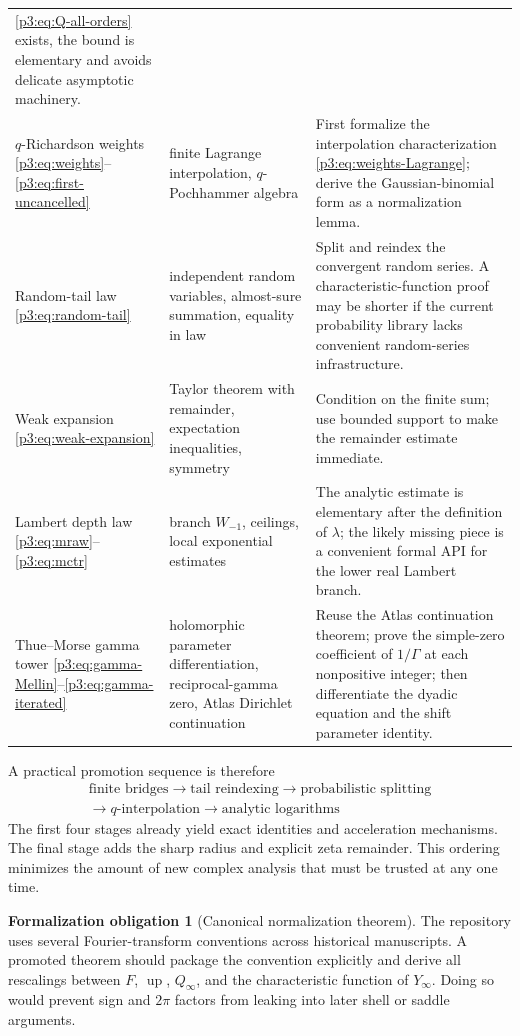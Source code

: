 \documentclass[11pt,oneside]{article}
\numberwithin{equation}{section}
\theoremstyle{definition}
\newtheorem{obligation}[theorem]{Formalization obligation}
\theoremstyle{remark}
\newcommand{\Up}{\operatorname{up}}
\begin{document}
\begin{longtable}{@{}p{}p{}p{}@{}}
\eqref{p3:eq:Q-all-orders} exists, the bound is elementary and avoids delicate asymptotic
machinery. \\
$q$-Richardson weights
\eqref{p3:eq:weights}--\eqref{p3:eq:first-uncancelled} & finite Lagrange interpolation,
$q$-Pochhammer algebra & First formalize the interpolation characterization
\eqref{p3:eq:weights-Lagrange}; derive the Gaussian-binomial form as a normalization lemma. \\
Random-tail law
\eqref{p3:eq:random-tail} & independent random variables, almost-sure summation, equality in law &
Split and reindex the convergent random series.  A characteristic-function proof may be
shorter if the current probability library lacks convenient random-series infrastructure. \\
Weak expansion
\eqref{p3:eq:weak-expansion} & Taylor theorem with remainder, expectation inequalities, symmetry &
Condition on the finite sum; use bounded support to make the remainder estimate immediate. \\
Lambert depth law
\eqref{p3:eq:mraw}--\eqref{p3:eq:mctr} & branch $W_{-1}$, ceilings, local exponential estimates & The
analytic estimate is elementary after the definition of $\lambda$; the likely missing piece is
a convenient formal API for the lower real Lambert branch. \\
Thue--Morse gamma tower
\eqref{p3:eq:gamma-Mellin}--\eqref{p3:eq:gamma-iterated} & holomorphic parameter differentiation,
reciprocal-gamma zero, Atlas Dirichlet continuation & Reuse the Atlas continuation theorem;
prove the simple-zero coefficient of $1/\Gamma$ at each nonpositive integer; then
differentiate the dyadic equation and the shift parameter identity. \\
\bottomrule
\end{longtable}
\endgroup

A practical promotion sequence is therefore
\[
 \boxed{\begin{gathered}
 \text{finite bridges}
 \longrightarrow \text{tail reindexing}
 \longrightarrow \text{probabilistic splitting}\\
 \longrightarrow \text{$q$-interpolation}
 \longrightarrow \text{analytic logarithms}
 \end{gathered}}
\]
The first four stages already yield exact identities and acceleration mechanisms.  The final
stage adds the sharp radius and explicit zeta remainder.  This ordering minimizes the amount
of new complex analysis that must be trusted at any one time.

\begin{obligation}[Canonical normalization theorem]
The repository uses several Fourier-transform conventions across historical manuscripts.
A promoted theorem should package the convention explicitly and derive all rescalings between
$F$, $\Up$, $Q_\infty$, and the characteristic function of $Y_\infty$.  Doing so would prevent
sign and $2\pi$ factors from leaking into later shell or saddle arguments.
\end{obligation}
\end{document}
